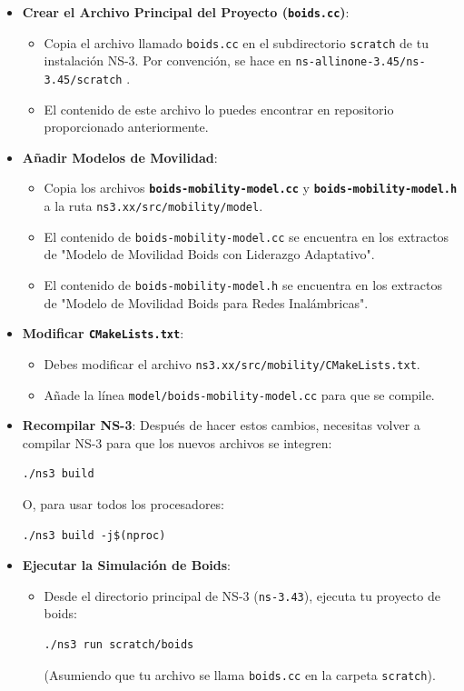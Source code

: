 \documentclass{article}
\begin{document}
\begin{itemize}
    \item \textbf{Crear el Archivo Principal del Proyecto (\texttt{boids.cc})}:
    \begin{itemize}
        \item Copia el archivo llamado \texttt{boids.cc} en el subdirectorio \texttt{scratch} de tu instalación NS-3. Por convención, se hace en \texttt{ns-allinone-3.45/ns-3.45/scratch} .
        \item El contenido de este archivo lo puedes encontrar en repositorio proporcionado anteriormente.
    \end{itemize}
    \item \textbf{Añadir Modelos de Movilidad}:
    \begin{itemize}
        \item Copia los archivos \textbf{\texttt{boids-mobility-model.cc}} y \textbf{\texttt{boids-mobility-model.h}} a la ruta \texttt{ns3.xx/src/mobility/model}.
        \item El contenido de \texttt{boids-mobility-model.cc} se encuentra en los extractos de "Modelo de Movilidad Boids con Liderazgo Adaptativo".
        \item El contenido de \texttt{boids-mobility-model.h} se encuentra en los extractos de "Modelo de Movilidad Boids para Redes Inalámbricas".
    \end{itemize}
    \item \textbf{Modificar \texttt{CMakeLists.txt}}:
    \begin{itemize}
        \item Debes modificar el archivo \texttt{ns3.xx/src/mobility/CMakeLists.txt}.
        \item Añade la línea \texttt{model/boids-mobility-model.cc} para que se compile.
    \end{itemize}
    \item \textbf{Recompilar NS-3}: Después de hacer estos cambios, necesitas volver a compilar NS-3 para que los nuevos archivos se integren:
    \begin{lstlisting}
./ns3 build 
    \end{lstlisting}
    O, para usar todos los procesadores:
    \begin{lstlisting}
./ns3 build -j$(nproc) 
    \end{lstlisting}
    \item \textbf{Ejecutar la Simulación de Boids}:
    \begin{itemize}
        \item Desde el directorio principal de NS-3 (\texttt{ns-3.43}), ejecuta tu proyecto de boids:
        \begin{lstlisting}
./ns3 run scratch/boids 
        \end{lstlisting}
        (Asumiendo que tu archivo se llama \texttt{boids.cc} en la carpeta \texttt{scratch}).
    \end{itemize}
\end{itemize}
\end{document}
